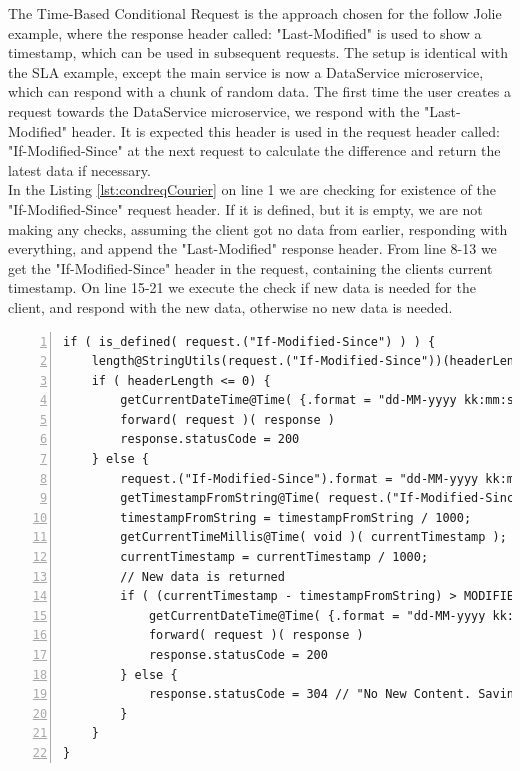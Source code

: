 \documentclass[12pt]{article}
\begin{document}
The Time-Based Conditional Request \cite{CondReqMAPI} is the approach chosen for the follow Jolie example, where the response header called: "Last-Modified" is used to show a timestamp, which can be used in subsequent requests. The setup is identical with the SLA example, except the main service is now a DataService microservice, which can respond with a chunk of random data. The first time the user creates a request towards the DataService microservice, we respond with the "Last-Modified" header. It is expected this header is used in the request header called: "If-Modified-Since" \cite{CondReqRFC} at the next request to calculate the difference and return the latest data if necessary. \\
In the Listing \ref{lst:condreqCourier} on line 1 we are checking for existence of the "If-Modified-Since" request header. If it is defined, but it is empty, we are not making any checks, assuming the client got no data from earlier, responding with everything, and append the "Last-Modified" response header. From line 8-13 we get the "If-Modified-Since" header in the request, containing the clients current timestamp. On line 15-21 we execute the check if new data is needed for the client, and respond with the new data, otherwise no new data is needed. 

\begin{lstlisting}[caption=Courier operations for the Conditional Request service, 
    captionpos=b, label={lst:condreqCourier}, frame=single, breaklines=true, numbers=left, basicstyle=\scriptsize]
if ( is_defined( request.("If-Modified-Since") ) ) {
    length@StringUtils(request.("If-Modified-Since"))(headerLength);
    if ( headerLength <= 0) {
        getCurrentDateTime@Time( {.format = "dd-MM-yyyy kk:mm:ss"} )( lastModified );
        forward( request )( response )
        response.statusCode = 200
    } else {
        request.("If-Modified-Since").format = "dd-MM-yyyy kk:mm:ss";
        getTimestampFromString@Time( request.("If-Modified-Since") )( timestampFromString );
        timestampFromString = timestampFromString / 1000;
        getCurrentTimeMillis@Time( void )( currentTimestamp );
        currentTimestamp = currentTimestamp / 1000;
        // New data is returned
        if ( (currentTimestamp - timestampFromString) > MODIFIED_TIMESTAMP ) {
            getCurrentDateTime@Time( {.format = "dd-MM-yyyy kk:mm:ss"} )( lastModified );
            forward( request )( response )
            response.statusCode = 200
        } else {
            response.statusCode = 304 // "No New Content. Saving Bandwidth";
        }
    }
}
\end{lstlisting}
\end{document}

